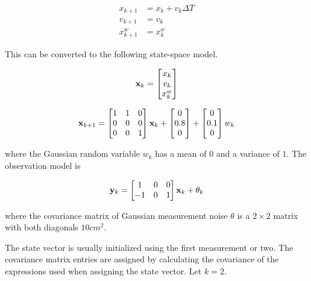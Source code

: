 \begin{align}
  x_{k+1} &= x_k + v_k \Delta T \\
  v_{k+1} &= v_k \\
  x_{k+1}^w &= x_k^w
\end{align}

This can be converted to the following state-space \gls{model}.

\begin{equation}
  \mathbf{x}_k =
  \begin{bmatrix}
    x_k \\
    v_k \\
    x_k^w
  \end{bmatrix}
\end{equation}

\begin{equation}
  \mathbf{x}_{k+1} =
  \begin{bmatrix}
    1 & 1 & 0 \\
    0 & 0 & 0 \\
    0 & 0 & 1
  \end{bmatrix} \mathbf{x}_k +
  \begin{bmatrix}
    0 \\
    0.8 \\
    0
  \end{bmatrix} +
  \begin{bmatrix}
    0 \\
    0.1 \\
    0
  \end{bmatrix} w_k
\end{equation}

where the Gaussian random variable $w_k$ has a mean of $0$ and a variance of
$1$. The observation \gls{model} is

\begin{equation}
  \mathbf{y}_k =
  \begin{bmatrix}
    1 & 0 & 0 \\
    -1 & 0 & 1
  \end{bmatrix} \mathbf{x}_k + \theta_k
\end{equation}

where the covariance matrix of Gaussian measurement noise $\theta$ is a
$2 \times 2$ matrix with both diagonals $10 cm^2$.

The \gls{state} vector is usually initialized using the first measurement or
two. The covariance matrix entries are assigned by calculating the covariance of
the expressions used when assigning the state vector. Let $k = 2$.

